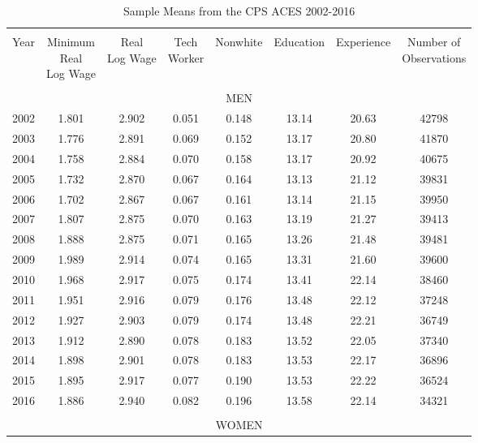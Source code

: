 
\begin{table}[!htbp] \centering 
  \caption{Sample Means from the CPS ACES 2002-2016} 
  \label{tab:tab_aces_summary} 
\begin{tabular}{@{\extracolsep{5pt}} cccccccc} 
\\[-1.8ex]\hline 
\hline \\[-1.8ex] 
Year & \thead{Minimum \\ Real \\ Log Wage} & \thead{Real \\ Log Wage} & \thead{Tech \\ Worker} & Nonwhite & Education & Experience & \thead{Number of \\ Observations} \\ 
\hline \\[-1.8ex] 
\multicolumn{8}{c}{MEN} \\
2002 & 1.801 & 2.902 & 0.051 & 0.148 & 13.14 & 20.63 & 42798 \\ 
2003 & 1.776 & 2.891 & 0.069 & 0.152 & 13.17 & 20.80 & 41870 \\ 
2004 & 1.758 & 2.884 & 0.070 & 0.158 & 13.17 & 20.92 & 40675 \\ 
2005 & 1.732 & 2.870 & 0.067 & 0.164 & 13.13 & 21.12 & 39831 \\ 
2006 & 1.702 & 2.867 & 0.067 & 0.161 & 13.14 & 21.15 & 39950 \\ 
2007 & 1.807 & 2.875 & 0.070 & 0.163 & 13.19 & 21.27 & 39413 \\ 
2008 & 1.888 & 2.875 & 0.071 & 0.165 & 13.26 & 21.48 & 39481 \\ 
2009 & 1.989 & 2.914 & 0.074 & 0.165 & 13.31 & 21.60 & 39600 \\ 
2010 & 1.968 & 2.917 & 0.075 & 0.174 & 13.41 & 22.14 & 38460 \\ 
2011 & 1.951 & 2.916 & 0.079 & 0.176 & 13.48 & 22.12 & 37248 \\ 
2012 & 1.927 & 2.903 & 0.079 & 0.174 & 13.48 & 22.21 & 36749 \\ 
2013 & 1.912 & 2.890 & 0.078 & 0.183 & 13.52 & 22.05 & 37340 \\ 
2014 & 1.898 & 2.901 & 0.078 & 0.183 & 13.53 & 22.17 & 36896 \\ 
2015 & 1.895 & 2.917 & 0.077 & 0.190 & 13.53 & 22.22 & 36524 \\ 
2016 & 1.886 & 2.940 & 0.082 & 0.196 & 13.58 & 22.14 & 34321 \\ 
\hline \\[-1.8ex] 
\multicolumn{8}{c}{WOMEN} \\

\end{tabular}
\end{table}
